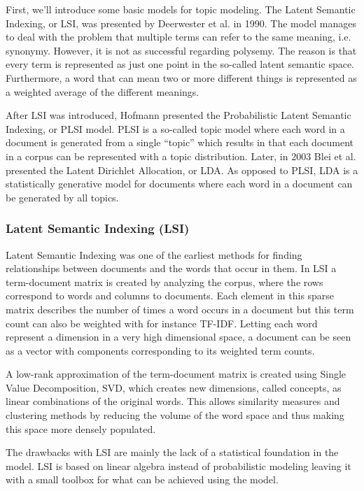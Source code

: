 \documentclass[12pt]{report}
\begin{document}
First, we’ll introduce some basic models for topic modeling. 
The Latent Semantic Indexing, or LSI, was presented by Deerwester et al. in 1990. 
The model manages to deal with the problem that multiple terms can refer to the same meaning, i.e. synonymy. 
However, it is not as successful regarding polysemy. 
The reason is that every term is represented as just one point in the so-called latent semantic space. 
Furthermore, a word that can mean two or more different things is represented as a weighted average of the different meanings.
 
After LSI was introduced, Hofmann presented the Probabilistic Latent Semantic Indexing, or PLSI model. 
PLSI is a so-called topic model where each word in a document is generated from a single “topic” which results in that each document in a corpus can be represented with a topic distribution. 
Later, in 2003 Blei et al. presented the Latent Dirichlet Allocation, or LDA.
As opposed to PLSI, LDA is a statistically generative model for documents where each word in a document can be generated by all topics.

\subsubsection{Latent Semantic Indexing (LSI)}

Latent Semantic Indexing was one of the earliest methods for finding relationships between documents and the words that occur in them. 
In LSI a term-document matrix is created by analyzing the corpus, where the rows correspond to words and columns to documents. 
Each element in this sparse matrix describes the number of times a word occurs in a document but this term count can also be weighted with for instance TF-IDF. 
Letting each word represent a dimension in a very high dimensional space, a document can be seen as a vector with components corresponding to its weighted term counts.

A low-rank approximation of the term-document matrix is created using Single Value Decomposition, SVD, which creates new dimensions, called concepts, as linear combinations of the original words. 
This allows similarity measures and clustering methods by reducing the volume of the word space and thus making this space more densely populated.


The drawbacks with LSI are mainly the lack of a statistical foundation in the model. 
LSI is based on linear algebra instead of probabilistic modeling leaving it with a small toolbox for what can be achieved using the model.
	
\end{document}
